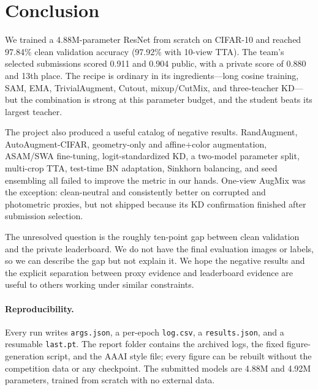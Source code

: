 \section{Conclusion}
\label{sec:conclusion}

We trained a 4.88M-parameter ResNet from scratch on CIFAR-10 and reached 97.84\%
clean validation accuracy (97.92\% with 10-view TTA). The team's selected
submissions scored 0.911 and 0.904 public, with a private score of 0.880 and
13th place. The
recipe is ordinary in its ingredients---long cosine training, SAM, EMA,
TrivialAugment, Cutout, mixup/CutMix, and three-teacher KD---but the combination
is strong at this parameter budget, and the student beats its largest teacher.

The project also produced a useful catalog of negative results. RandAugment,
AutoAugment-CIFAR, geometry-only and affine+color augmentation, ASAM/SWA
fine-tuning, logit-standardized KD, a two-model parameter split, multi-crop TTA,
test-time BN adaptation, Sinkhorn balancing, and seed ensembling all failed to
improve the metric in our hands. One-view AugMix was the exception: clean-neutral and
consistently better on corrupted and photometric proxies, but not shipped because
its KD confirmation finished after submission selection.

The unresolved question is the roughly ten-point gap between clean validation and
the private leaderboard. We do not have the final evaluation images or labels,
so we can describe the gap but not explain it. We hope the
negative results and the explicit separation between proxy evidence and
leaderboard evidence are useful to others working under similar constraints.

\paragraph{Reproducibility.}
Every run writes \texttt{args.json}, a per-epoch \texttt{log.csv}, a
\texttt{results.json}, and a resumable \texttt{last.pt}. The report folder
contains the archived logs, the fixed figure-generation script, and the AAAI
style file; every figure can be rebuilt without the competition data or any
checkpoint. The submitted models are 4.88M and 4.92M parameters, trained from
scratch with no external data.
